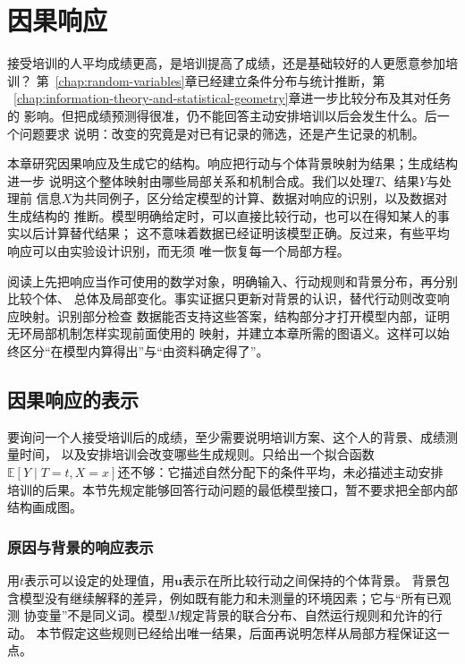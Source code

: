 \chapter{因果响应}
\label{chap:causal-inference}

接受培训的人平均成绩更高，是培训提高了成绩，还是基础较好的人更愿意参加培训？
第~\ref{chap:random-variables}章已经建立条件分布与统计推断，第
~\ref{chap:information-theory-and-statistical-geometry}章进一步比较分布及其对任务的
影响。但把成绩预测得很准，仍不能回答主动安排培训以后会发生什么。后一个问题要求
说明：改变的究竟是对已有记录的筛选，还是产生记录的机制。

本章研究因果响应及生成它的结构。响应把行动与个体背景映射为结果；生成结构进一步
说明这个整体映射由哪些局部关系和机制合成。我们以处理\(T\)、结果\(Y\)与处理前
信息\(X\)为共同例子，区分给定模型的计算、数据对响应的识别，以及数据对生成结构的
推断。模型明确给定时，可以直接比较行动，也可以在得知某人的事实以后计算替代结果；
这不意味着数据已经证明该模型正确。反过来，有些平均响应可以由实验设计识别，而无须
唯一恢复每一个局部方程。

阅读上先把响应当作可使用的数学对象，明确输入、行动规则和背景分布，再分别比较个体、
总体及局部变化。事实证据只更新对背景的认识，替代行动则改变响应映射。识别部分检查
数据能否支持这些答案，结构部分才打开模型内部，证明无环局部机制怎样实现前面使用的
映射，并建立本章所需的图语义。这样可以始终区分“在模型内算得出”与“由资料确定得了”。

\section{因果响应的表示}
\label{sec:causal-response-representation}

要询问一个人接受培训后的成绩，至少需要说明培训方案、这个人的背景、成绩测量时间，
以及安排培训会改变哪些生成规则。只给出一个拟合函数
\(\mathbb E[Y\mid T=t,X=x]\)还不够：它描述自然分配下的条件平均，未必描述主动安排
培训的后果。本节先规定能够回答行动问题的最低模型接口，暂不要求把全部内部结构画成图。

\subsection{原因与背景的响应表示}
\label{sec:causal-observation-generation}

用\(t\)表示可以设定的处理值，用\(\bm u\)表示在所比较行动之间保持的个体背景。
背景包含模型没有继续解释的差异，例如既有能力和未测量的环境因素；它与“所有已观测
协变量”不是同义词。模型\(M\)规定背景的联合分布、自然运行规则和允许的行动。
本节假定这些规则已经给出唯一结果，后面再说明怎样从局部方程保证这一点。

